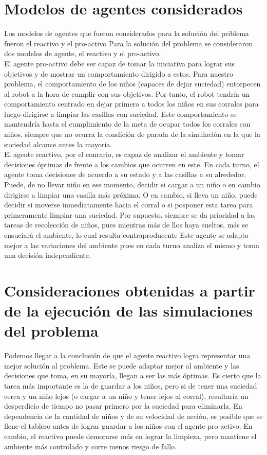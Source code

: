 \documentclass[a4paper,12pt]{article}
\begin{document}
\section*{Modelos de agentes considerados}
Los modelos de agentes que fueron considerados para la solución del priblema fueron el reactivo y el pro-activo
Para la solución del problema se consideraron dos modelos de agente, el reactivo y el pro-activo.\\
El agente pro-activo debe ser capaz de tomar la iniciativa para lograr sus objetivos y de mostrar un comportamiento dirigido a estos. Para nuestro problema, el comportamiento de los niños (capaces de dejar suciedad) entorpecen al robot a la hora de cumplir con sus objetivos. Por tanto, el robot tendría un comportamiento centrado en dejar primero a todos los niños en sus corrales para luego dirigirse a limpiar las casillas con suciedad. Este comportamiento se mantendría hasta el cumplimiento de la meta de ocupar todos los corrales con niños, siempre que no ocurra la condición de parada de la simulación en la que la suciedad alcance antes la mayoría.\\
El agente reactivo, por el conrario, es capaz de analizar el ambiente y tomar decisiones óptimas de frente a los cambios que ocurren en este. En cada turno, el agente toma decisiones de acuerdo a su estado y a las casillas a su alrededor. Puede, de no llevar niño en ese momento, decidir si cargar a un niño o en cambio dirigirse a limpiar una casilla más próxima. O en cambio, si lleva un niño, puede decidir si moverse inmediatamente hacia el corral o si posponer esta tarea para primeramente limpiar una suciedad. Por supuesto, siempre se da prioridad a las tareas de recolección de niños, pues mientras más de llos haya sueltos, más se ensuciará el ambiente, lo cual resulta contraproducente Este agente se adapta mejor a las variaciones del ambiente pues en cada turno analiza el mismo y toma una decisión independiente.

\section*{ Consideraciones obtenidas a partir de la ejecución de las simulaciones del problema}
Podemos llegar a la conclusión de que el agente reactivo logra representar una mejor solución al problema. Este se puede adaptar mejor al ambiente y las decisiones que toma, en su mayoría, llegan a ser las más óptimas. Es cierto que la tarea más importante es la de guardar a los niños, pero si de tener una suciedad cerca y un niño lejos (o cargar a un niño y tener lejos al corral), resultaría un desperdicio de tiempo no pasar primero por la suciedad para eliminarla.
En dependencia de la cantidad de niños y de su velocidad de acción, es posible que se llene el tablero antes de lograr guardar a los niños con el agente pro-activo. En cambio, el reactivo puede demorarse más en lograr la limpieza, pero mantiene el ambiente más controlado y corre menos riesgo de fallo.
\end{document}
